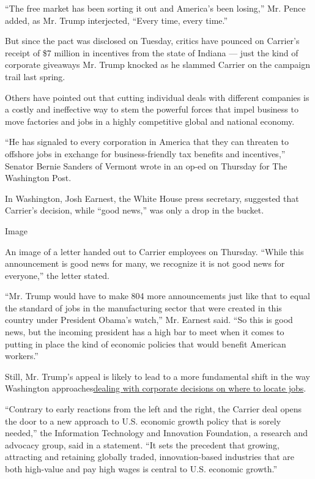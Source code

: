 ``The free market has been sorting it out and America's been losing,''
Mr. Pence added, as Mr. Trump interjected, ``Every time, every time.''

But since the pact was disclosed on Tuesday, critics have pounced on
Carrier's receipt of \$7 million in incentives from the state of Indiana
--- just the kind of corporate giveaways Mr. Trump knocked as he slammed
Carrier on the campaign trail last spring.

Others have pointed out that cutting individual deals with different
companies is a costly and ineffective way to stem the powerful forces
that impel business to move factories and jobs in a highly competitive
global and national economy.

``He has signaled to every corporation in America that they can threaten
to offshore jobs in exchange for business-friendly tax benefits and
incentives,'' Senator Bernie Sanders of Vermont wrote in an op-ed on
Thursday for The Washington Post.

In Washington, Josh Earnest, the White House press secretary, suggested
that Carrier's decision, while ``good news,'' was only a drop in the
bucket.

Image

An image of a letter handed out to Carrier employees on Thursday.
``While this announcement is good news for many, we recognize it is not
good news for everyone,'' the letter stated.

``Mr. Trump would have to make 804 more announcements just like that to
equal the standard of jobs in the manufacturing sector that were created
in this country under President Obama's watch,'' Mr. Earnest said. ``So
this is good news, but the incoming president has a high bar to meet
when it comes to putting in place the kind of economic policies that
would benefit American workers.''

Still, Mr. Trump's appeal is likely to lead to a more fundamental shift
in the way Washington
approaches\href{https://www.nytimes.com/2016/11/30/business/economy/trump-saved-jobs-at-carrier-but-more-midwest-jobs-are-in-jeopardy.html}{dealing
with corporate decisions on where to locate jobs}.

``Contrary to early reactions from the left and the right, the Carrier
deal opens the door to a new approach to U.S. economic growth policy
that is sorely needed,'' the Information Technology and Innovation
Foundation, a research and advocacy group, said in a statement. ``It
sets the precedent that growing, attracting and retaining globally
traded, innovation-based industries that are both high-value and pay
high wages is central to U.S. economic growth.''

